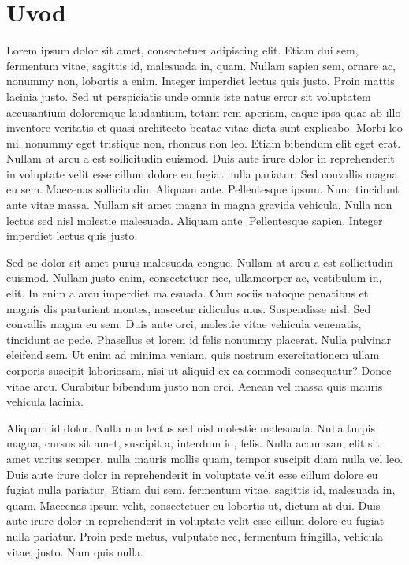 \section{Uvod} 

Lorem ipsum dolor sit amet, consectetuer adipiscing elit. Etiam dui sem, fermentum vitae, sagittis id, malesuada in, quam. Nullam sapien sem, ornare ac, nonummy non, lobortis a enim. Integer imperdiet lectus quis justo. Proin mattis lacinia justo. Sed ut perspiciatis unde omnis iste natus error sit voluptatem accusantium doloremque laudantium, totam rem aperiam, eaque ipsa quae ab illo inventore veritatis et quasi architecto beatae vitae dicta sunt explicabo. Morbi leo mi, nonummy eget tristique non, rhoncus non leo. Etiam bibendum elit eget erat. Nullam at arcu a est sollicitudin euismod. Duis aute irure dolor in reprehenderit in voluptate velit esse cillum dolore eu fugiat nulla pariatur. Sed convallis magna eu sem. Maecenas sollicitudin. Aliquam ante. Pellentesque ipsum. Nunc tincidunt ante vitae massa. Nullam sit amet magna in magna gravida vehicula. Nulla non lectus sed nisl molestie malesuada. Aliquam ante. Pellentesque sapien. Integer imperdiet lectus quis justo.

Sed ac dolor sit amet purus malesuada congue. Nullam at arcu a est sollicitudin euismod. Nullam justo enim, consectetuer nec, ullamcorper ac, vestibulum in, elit. In enim a arcu imperdiet malesuada. Cum sociis natoque penatibus et magnis dis parturient montes, nascetur ridiculus mus. Suspendisse nisl. Sed convallis magna eu sem. Duis ante orci, molestie vitae vehicula venenatis, tincidunt ac pede. Phasellus et lorem id felis nonummy placerat. Nulla pulvinar eleifend sem. Ut enim ad minima veniam, quis nostrum exercitationem ullam corporis suscipit laboriosam, nisi ut aliquid ex ea commodi consequatur? Donec vitae arcu. Curabitur bibendum justo non orci. Aenean vel massa quis mauris vehicula lacinia.

Aliquam id dolor. Nulla non lectus sed nisl molestie malesuada. Nulla turpis magna, cursus sit amet, suscipit a, interdum id, felis. Nulla accumsan, elit sit amet varius semper, nulla mauris mollis quam, tempor suscipit diam nulla vel leo. Duis aute irure dolor in reprehenderit in voluptate velit esse cillum dolore eu fugiat nulla pariatur. Etiam dui sem, fermentum vitae, sagittis id, malesuada in, quam. Maecenas ipsum velit, consectetuer eu lobortis ut, dictum at dui. Duis aute irure dolor in reprehenderit in voluptate velit esse cillum dolore eu fugiat nulla pariatur. Proin pede metus, vulputate nec, fermentum fringilla, vehicula vitae, justo. Nam quis nulla.

